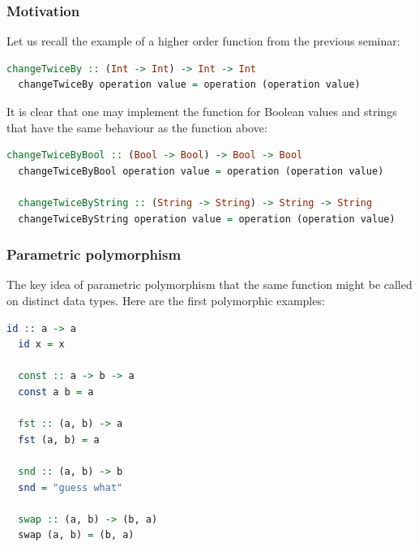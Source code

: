 \documentclass[10pt,pdf,utf8,russian,aspectratio=169]{beamer}
\begin{document}
\begin{frame}[fragile]
  \frametitle{Motivation}
  Let us recall the example of a higher order function from the previous seminar:

  \begin{lstlisting}[language=Haskell]
  changeTwiceBy :: (Int -> Int) -> Int -> Int
  changeTwiceBy operation value = operation (operation value)
  \end{lstlisting}

  \vspace{\baselineskip}

  It is clear that one may implement the function for Boolean values and strings that have the same behaviour as the function above:

  \begin{lstlisting}[language=Haskell]
  changeTwiceByBool :: (Bool -> Bool) -> Bool -> Bool
  changeTwiceByBool operation value = operation (operation value)

  changeTwiceByString :: (String -> String) -> String -> String
  changeTwiceByString operation value = operation (operation value)
  \end{lstlisting}

\end{frame}

\begin{frame}[fragile]
  \frametitle{Parametric polymorphism}

The key idea of parametric polymorphism that the same function might be called on distinct data types. Here are the first polymorphic examples:

  \begin{lstlisting}[language=Haskell]
  id :: a -> a
  id x = x

  const :: a -> b -> a
  const a b = a

  fst :: (a, b) -> a
  fst (a, b) = a

  snd :: (a, b) -> b
  snd = "guess what"

  swap :: (a, b) -> (b, a)
  swap (a, b) = (b, a)
  \end{lstlisting}
\end{frame}
\end{document}
